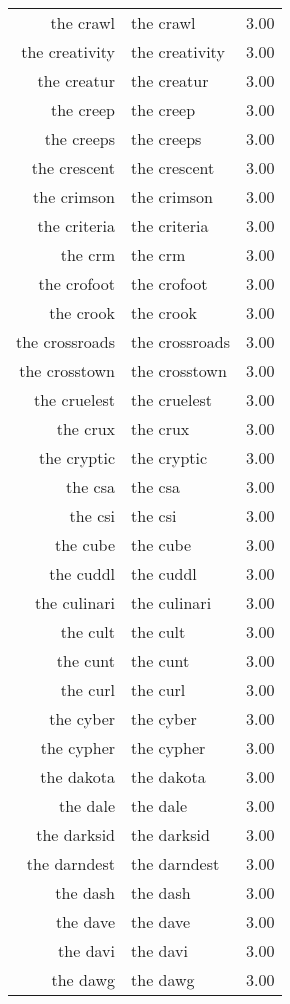 \begin{table}[ht]
\begin{tabular}{rlr}
  the crawl & the crawl & 3.00 \\ 
  the creativity & the creativity & 3.00 \\ 
  the creatur & the creatur & 3.00 \\ 
  the creep & the creep & 3.00 \\ 
  the creeps & the creeps & 3.00 \\ 
  the crescent & the crescent & 3.00 \\ 
  the crimson & the crimson & 3.00 \\ 
  the criteria & the criteria & 3.00 \\ 
  the crm & the crm & 3.00 \\ 
  the crofoot & the crofoot & 3.00 \\ 
  the crook & the crook & 3.00 \\ 
  the crossroads & the crossroads & 3.00 \\ 
  the crosstown & the crosstown & 3.00 \\ 
  the cruelest & the cruelest & 3.00 \\ 
  the crux & the crux & 3.00 \\ 
  the cryptic & the cryptic & 3.00 \\ 
  the csa & the csa & 3.00 \\ 
  the csi & the csi & 3.00 \\ 
  the cube & the cube & 3.00 \\ 
  the cuddl & the cuddl & 3.00 \\ 
  the culinari & the culinari & 3.00 \\ 
  the cult & the cult & 3.00 \\ 
  the cunt & the cunt & 3.00 \\ 
  the curl & the curl & 3.00 \\ 
  the cyber & the cyber & 3.00 \\ 
  the cypher & the cypher & 3.00 \\ 
  the dakota & the dakota & 3.00 \\ 
  the dale & the dale & 3.00 \\ 
  the darksid & the darksid & 3.00 \\ 
  the darndest & the darndest & 3.00 \\ 
  the dash & the dash & 3.00 \\ 
  the dave & the dave & 3.00 \\ 
  the davi & the davi & 3.00 \\ 
  the dawg & the dawg & 3.00 \\ 

\end{tabular}
\end{table}
